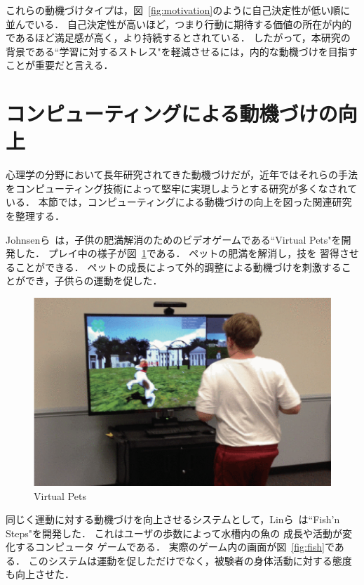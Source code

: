 これらの動機づけタイプは，図~\ref{fig:motivation}のように自己決定性が低い順に並んでいる．
自己決定性が高いほど，つまり行動に期待する価値の所在が内的であるほど満足感が高く，より持続するとされている．
したがって，本研究の背景である``学習に対するストレス"を軽減させるには，内的な動機づけを目指すことが重要だと言える．

\section{コンピューティングによる動機づけの向上}
心理学の分野において長年研究されてきた動機づけだが，近年ではそれらの手法をコンピューティング技術によって堅牢に実現しようとする研究が多くなされている．
本節では，コンピューティングによる動機づけの向上を図った関連研究を整理する．

Johnsenら~\cite{johnsen2014mixed}は，子供の肥満解消のためのビデオゲームである``Virtual Pets"を開発した．
プレイ中の様子が図~\ref{fig:VirtualPets}である．
ペットの肥満を解消し，技を
習得させることができる．
ペットの成長によって外的調整による動機づけを刺激することができ，子供らの運動を促した．

\begin{figure}[ht]
	\begin{center}
	\includegraphics[width=12cm]{images/2/VirtualPets.eps}
	\caption{Virtual Pets}
	\label{fig:VirtualPets}
	\end{center}
\end{figure}

同じく運動に対する動機づけを向上させるシステムとして，Linら~\cite{lin2006fish}は``Fish’n Steps"を開発した．
これはユーザの歩数によって水槽内の魚の
成長や活動が変化するコンピュータ
ゲームである．
実際のゲーム内の画面が図~\ref{fig:fish}である．
このシステムは運動を促しただけでなく，被験者の身体活動に対する態度も向上させた．

